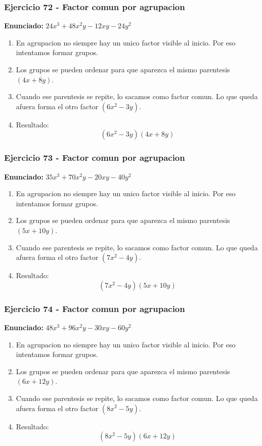 \documentclass[11pt,a4paper]{article}
\begin{document}
\vspace{0.2cm}
\subsubsection*{Ejercicio 72 - Factor comun por agrupacion}
\textbf{Enunciado:} $ 24 x^{3} + 48 x^{2} y - 12 x y - 24 y^{2} $\par
\begin{enumerate}[leftmargin=2em]
\item En agrupacion no siempre hay un unico factor visible al inicio. Por eso intentamos formar grupos.
\item Los grupos se pueden ordenar para que aparezca el mismo parentesis \((4 x + 8 y)\).
\item Cuando ese parentesis se repite, lo sacamos como factor comun. Lo que queda afuera forma el otro factor \((6 x^{2} - 3 y)\).
\item Resultado: \[\boxed{\left(6 x^{2} - 3 y\right)\left(4 x + 8 y\right)}\]
\end{enumerate}

\vspace{0.2cm}
\subsubsection*{Ejercicio 73 - Factor comun por agrupacion}
\textbf{Enunciado:} $ 35 x^{3} + 70 x^{2} y - 20 x y - 40 y^{2} $\par
\begin{enumerate}[leftmargin=2em]
\item En agrupacion no siempre hay un unico factor visible al inicio. Por eso intentamos formar grupos.
\item Los grupos se pueden ordenar para que aparezca el mismo parentesis \((5 x + 10 y)\).
\item Cuando ese parentesis se repite, lo sacamos como factor comun. Lo que queda afuera forma el otro factor \((7 x^{2} - 4 y)\).
\item Resultado: \[\boxed{\left(7 x^{2} - 4 y\right)\left(5 x + 10 y\right)}\]
\end{enumerate}

\vspace{0.2cm}
\subsubsection*{Ejercicio 74 - Factor comun por agrupacion}
\textbf{Enunciado:} $ 48 x^{3} + 96 x^{2} y - 30 x y - 60 y^{2} $\par
\begin{enumerate}[leftmargin=2em]
\item En agrupacion no siempre hay un unico factor visible al inicio. Por eso intentamos formar grupos.
\item Los grupos se pueden ordenar para que aparezca el mismo parentesis \((6 x + 12 y)\).
\item Cuando ese parentesis se repite, lo sacamos como factor comun. Lo que queda afuera forma el otro factor \((8 x^{2} - 5 y)\).
\item Resultado: \[\boxed{\left(8 x^{2} - 5 y\right)\left(6 x + 12 y\right)}\]
\end{enumerate}
\end{document}
